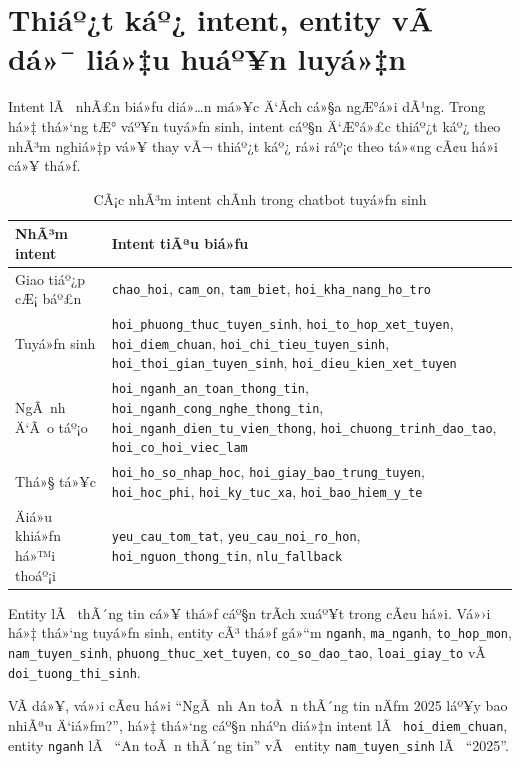 ﻿\documentclass[12pt,a4paper]{report}
\begin{document}
\section{Thiáº¿t káº¿ intent, entity vÃ  dá»¯ liá»‡u huáº¥n luyá»‡n}

Intent lÃ  nhÃ£n biá»ƒu diá»…n má»¥c Ä‘Ã­ch cá»§a ngÆ°á»i dÃ¹ng. Trong há»‡ thá»‘ng tÆ° váº¥n tuyá»ƒn sinh, intent cáº§n Ä‘Æ°á»£c thiáº¿t káº¿ theo nhÃ³m nghiá»‡p vá»¥ thay vÃ¬ thiáº¿t káº¿ rá»i ráº¡c theo tá»«ng cÃ¢u há»i cá»¥ thá»ƒ.

\begin{table}[H]
\centering
\begin{tabular}{|p{4cm}|p{8.5cm}|}
\hline
\textbf{NhÃ³m intent} & \textbf{Intent tiÃªu biá»ƒu} \\
\hline
Giao tiáº¿p cÆ¡ báº£n & \texttt{chao\_hoi}, \texttt{cam\_on}, \texttt{tam\_biet}, \texttt{hoi\_kha\_nang\_ho\_tro} \\
\hline
Tuyá»ƒn sinh & \texttt{hoi\_phuong\_thuc\_tuyen\_sinh}, \texttt{hoi\_to\_hop\_xet\_tuyen}, \texttt{hoi\_diem\_chuan}, \texttt{hoi\_chi\_tieu\_tuyen\_sinh}, \texttt{hoi\_thoi\_gian\_tuyen\_sinh}, \texttt{hoi\_dieu\_kien\_xet\_tuyen} \\
\hline
NgÃ nh Ä‘Ã o táº¡o & \texttt{hoi\_nganh\_an\_toan\_thong\_tin}, \texttt{hoi\_nganh\_cong\_nghe\_thong\_tin}, \texttt{hoi\_nganh\_dien\_tu\_vien\_thong}, \texttt{hoi\_chuong\_trinh\_dao\_tao}, \texttt{hoi\_co\_hoi\_viec\_lam} \\
\hline
Thá»§ tá»¥c & \texttt{hoi\_ho\_so\_nhap\_hoc}, \texttt{hoi\_giay\_bao\_trung\_tuyen}, \texttt{hoi\_hoc\_phi}, \texttt{hoi\_ky\_tuc\_xa}, \texttt{hoi\_bao\_hiem\_y\_te} \\
\hline
Äiá»u khiá»ƒn há»™i thoáº¡i & \texttt{yeu\_cau\_tom\_tat}, \texttt{yeu\_cau\_noi\_ro\_hon}, \texttt{hoi\_nguon\_thong\_tin}, \texttt{nlu\_fallback} \\
\hline
\end{tabular}
\caption{CÃ¡c nhÃ³m intent chÃ­nh trong chatbot tuyá»ƒn sinh}
\label{tab:rasa-intent-groups}
\end{table}

Entity lÃ  thÃ´ng tin cá»¥ thá»ƒ cáº§n trÃ­ch xuáº¥t trong cÃ¢u há»i. Vá»›i há»‡ thá»‘ng tuyá»ƒn sinh, entity cÃ³ thá»ƒ gá»“m \texttt{nganh}, \texttt{ma\_nganh}, \texttt{to\_hop\_mon}, \texttt{nam\_tuyen\_sinh}, \texttt{phuong\_thuc\_xet\_tuyen}, \texttt{co\_so\_dao\_tao}, \texttt{loai\_giay\_to} vÃ  \texttt{doi\_tuong\_thi\_sinh}.

VÃ­ dá»¥, vá»›i cÃ¢u há»i ``NgÃ nh An toÃ n thÃ´ng tin nÄƒm 2025 láº¥y bao nhiÃªu Ä‘iá»ƒm?'', há»‡ thá»‘ng cáº§n nháº­n diá»‡n intent lÃ  \texttt{hoi\_diem\_chuan}, entity \texttt{nganh} lÃ  ``An toÃ n thÃ´ng tin'' vÃ  entity \texttt{nam\_tuyen\_sinh} lÃ  ``2025''.
\end{document}
